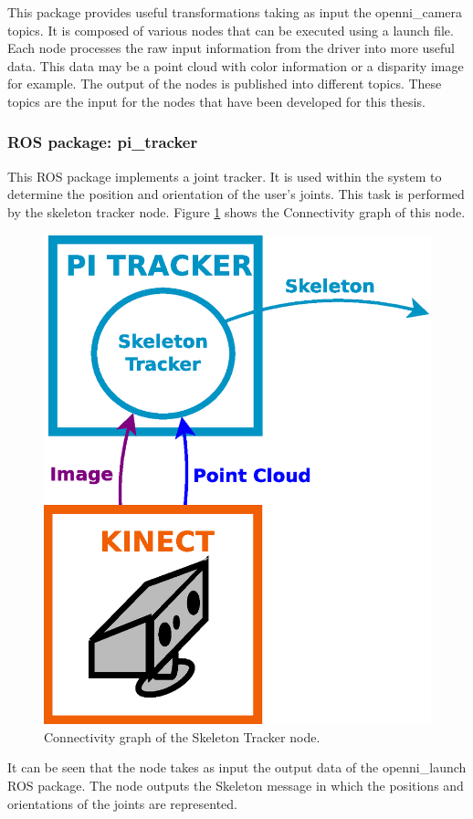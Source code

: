 This package provides useful transformations taking as input the openni\_camera topics. %
It is composed of various nodes that can be executed using a launch file. 
Each node processes the raw input information from the driver into more useful data. 
This data may be a point cloud with color information or a disparity image for example. 
The output of the nodes is published into different topics. 
These topics are the input for the nodes that have been developed for this thesis.

\subsubsection{ROS package: pi\_tracker}
\label{pi_tracker}
This ROS package implements a joint tracker.
It is used within the system to determine the position and orientation of the user's joints. 
This task is performed by the skeleton tracker node.  
Figure \ref{diagram_skeleton} shows the Connectivity graph of this node. 

		\begin{figure}[H]
			\begin{center}
			\includegraphics[width=0.3\linewidth]{img/diagrams/node_pi_tracker.eps}
			\caption[Skeleton Tracker I/O]{Connectivity graph of the Skeleton Tracker node.}
			\label{diagram_skeleton}
			\end{center}
		\end{figure}

It can be seen that the node takes as input the output data of the openni\_launch ROS package. 
The node outputs the Skeleton message in which the positions and orientations of the joints are represented. 



